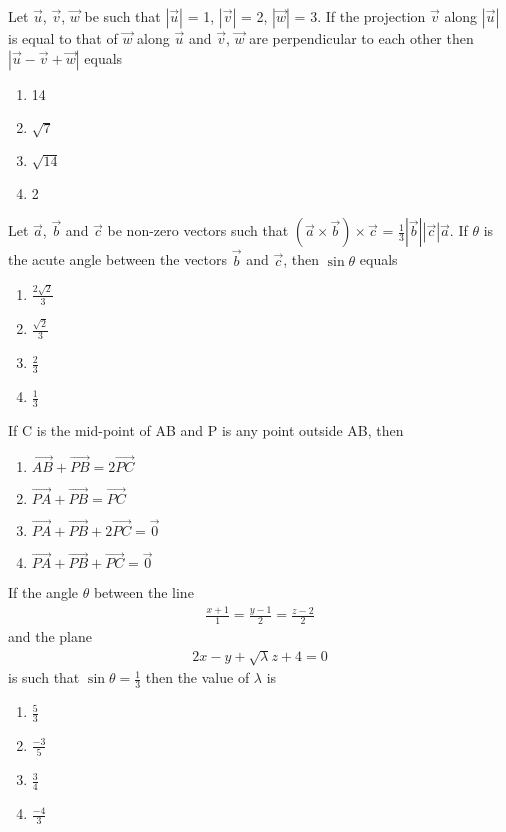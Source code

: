 \item Let $\overrightarrow{u}$, $\overrightarrow{v}$, $\overrightarrow{w}$ be such that $|\overrightarrow{u}|$ = 1, 
$|\overrightarrow{v}|$ = 2, $|\overrightarrow{w}|$ = 3. If the projection $\overrightarrow{v}$ along 
$|\overrightarrow{u}|$ is equal to that of $\overrightarrow{w}$ along $\overrightarrow{u}$ and $\overrightarrow{v}$, 
$\overrightarrow{w}$ are perpendicular to each other then $|\overrightarrow{u} - \overrightarrow{v} + \overrightarrow{w}|$ equals
\begin{enumerate}
\item 14
\item $\sqrt{7}$
\item $\sqrt{14}$
\item 2
\end{enumerate}

\item Let $\overrightarrow{a}$, $\overrightarrow{b}$ and $\overrightarrow{c}$ be non-zero vectors such that $(\overrightarrow{a} \times \overrightarrow{b}) \times \overrightarrow{c}$ = $\frac{1}{3}|\overrightarrow{b}||\overrightarrow{c}|\overrightarrow{a}$. If $\theta$ is the acute angle between the vectors $\overrightarrow{b}$ and $\overrightarrow{c}$, then $\sin\theta$ equals
\begin{enumerate}
\item $\frac{2\sqrt{2}}{3}$
\item $\frac{\sqrt{2}}{3}$
\item $\frac{2}{3}$
\item $\frac{1}{3}$
\end{enumerate}

\item If C is the mid-point of AB and P is any point outside AB, then 
\begin{enumerate}
\item $\overrightarrow{AB} + \overrightarrow{PB} = 2\overrightarrow{PC}$
\item $\overrightarrow{PA} + \overrightarrow{PB} = \overrightarrow{PC}$
\item $\overrightarrow{PA} + \overrightarrow{PB} + 2\overrightarrow{PC} = \overrightarrow{0}$
\item $\overrightarrow{PA} + \overrightarrow{PB} + \overrightarrow{PC} = \overrightarrow{0}$
\end{enumerate}

\item If the angle $\theta$ between the line 
\begin{align*}
\frac{x + 1}{1} = \frac{y - 1}{2} = \frac{z - 2}{2}
\end{align*}
and the plane 
\begin{align*}
2x - y + \sqrt{\lambda}z + 4 = 0
\end{align*}
 is such that $\sin\theta = \frac{1}{3}$ then the value of $\lambda$ is
\begin{enumerate}
\item $\frac{5}{3}$
\item $\frac{-3}{5}$
\item $\frac{3}{4}$
\item $\frac{-4}{3}$
\end{enumerate}

